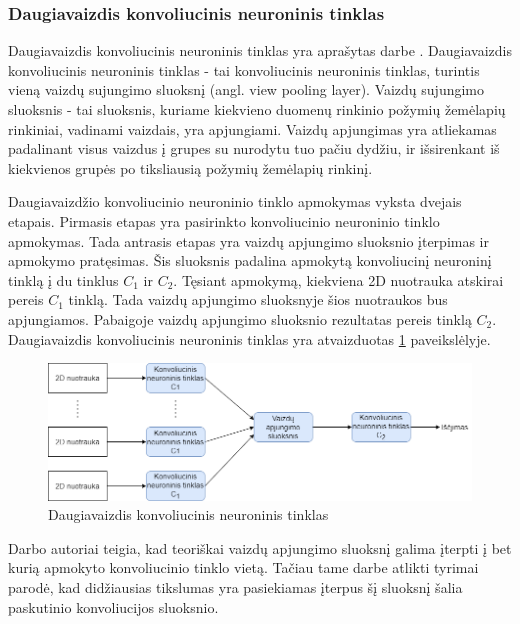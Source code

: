 \subsubsection{Daugiavaizdis konvoliucinis neuroninis tinklas}

Daugiavaizdis konvoliucinis neuroninis tinklas yra aprašytas darbe \cite{cnnExp1}. Daugiavaizdis konvoliucinis neuroninis tinklas - tai konvoliucinis neuroninis tinklas, turintis vieną vaizdų sujungimo sluoksnį (angl. view pooling layer). Vaizdų sujungimo sluoksnis - tai sluoksnis, kuriame kiekvieno duomenų rinkinio požymių žemėlapių rinkiniai, vadinami vaizdais, yra apjungiami. Vaizdų apjungimas yra atliekamas padalinant visus vaizdus į grupes su nurodytu tuo pačiu dydžiu, ir išsirenkant iš kiekvienos grupės po tiksliausią požymių žemėlapių rinkinį.

Daugiavaizdžio konvoliucinio neuroninio tinklo apmokymas vyksta dvejais etapais. Pirmasis etapas yra pasirinkto konvoliucinio neuroninio tinklo apmokymas. Tada antrasis etapas yra vaizdų apjungimo sluoksnio įterpimas ir apmokymo pratęsimas. Šis sluoksnis padalina apmokytą konvoliucinį neuroninį tinklą į du tinklus $C_1$ ir $C_2$. Tęsiant apmokymą, kiekviena 2D nuotrauka atskirai pereis $C_1$ tinklą. Tada vaizdų apjungimo sluoksnyje šios nuotraukos bus apjungiamos. Pabaigoje vaizdų apjungimo sluoksnio rezultatas pereis tinklą $C_2$. Daugiavaizdis konvoliucinis neuroninis tinklas yra atvaizduotas \ref{img:mvcnn} paveikslėlyje.

\begin{figure}[H]
	\centering
	\includegraphics[scale=0.5]{img/mvcnn.png}
	\caption{Daugiavaizdis konvoliucinis neuroninis tinklas}
	\label{img:mvcnn}
\end{figure}

Darbo \cite{cnnExp1} autoriai teigia, kad teoriškai vaizdų apjungimo sluoksnį galima įterpti į bet kurią apmokyto konvoliucinio tinklo vietą. Tačiau tame darbe atlikti tyrimai parodė, kad didžiausias tikslumas yra pasiekiamas įterpus šį sluoksnį šalia paskutinio konvoliucijos sluoksnio.

